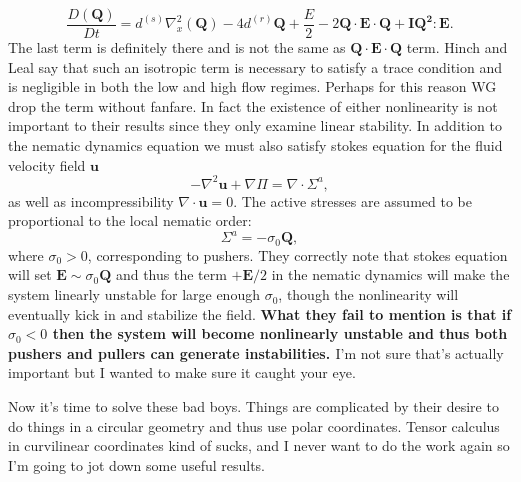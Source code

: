 \documentclass[onecolumn,showpacs,preprintnumbers,prl,amsmath,amssymb]{revtex4-1}
\def\b{\mathbf}
\begin{document}
\begin{equation}
\frac{D(\b{Q})}{Dt}=d^{(s)}\nabla_x^2(\b{Q})-4d^{(r)}\b{Q}+\frac{E}{2}-2 \b{Q}\cdot\b{E}\cdot\b{Q}+\b{IQ^2}:\b{E}.
\end{equation}
The last term is definitely there and is not the same as $ \b{Q}\cdot\b{E}\cdot\b{Q}$ term.  Hinch and Leal say that such an isotropic term is necessary to satisfy a trace condition and is negligible in both the low and high flow regimes.  Perhaps for this reason WG drop the term without fanfare. In fact the existence of either nonlinearity is not important to their results since they only examine linear stability. In addition to the nematic dynamics  equation we must also satisfy stokes equation for the fluid velocity field $\b{u}$
\begin{equation}
-\nabla^2 \b{u} + \nabla \Pi = \nabla \cdot \Sigma^a,
\end{equation}
as well as incompressibility $\nabla\cdot \b{u}=0$.  The active stresses are assumed to be proportional to the local nematic order:
\begin{equation}
\Sigma^a=-\sigma_0\b{Q},
\end{equation}
where $\sigma_0>0$, corresponding to pushers.  They correctly note that stokes equation will set $\b{E}\sim\sigma_0\b{Q}$ and thus the term $+\b{E}/2$ in the nematic dynamics will make the system linearly unstable for large enough $\sigma_0$, though the nonlinearity will eventually kick in and stabilize the field. { \bf{ What they fail to mention is that if $\sigma_0<0$ then the system will become nonlinearly unstable and thus both pushers and pullers can generate instabilities.  } } I'm not sure that's actually important but I wanted to make sure it caught your eye.  

Now it's time to solve these bad boys.  Things are complicated by their desire to do things in a circular geometry and thus use polar coordinates.  Tensor calculus in curvilinear coordinates kind of sucks, and I never want to do the work again so I'm going to jot down some useful results.
\end{document}
